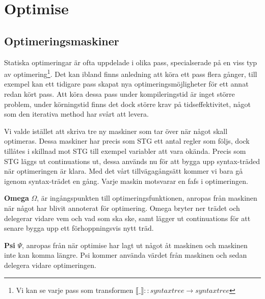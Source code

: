 \documentclass[Rapport]{subfiles}
\begin{document}
\section{Optimise}





\subsection{Optimeringsmaskiner}

Statiska optimeringar är ofta uppdelade i olika pass, specialserade på en viss
typ av optimering\footnote{Vi kan se varje pass som transformen $\llbracket \_ \rrbracket :: syntaxtree \rightarrow syntaxtree$}. Det kan ibland finns anledning att köra ett pass flera gånger, till exempel kan ett tidigare pass skapat nya optimeringsmöjligheter för ett annat redan kört pass. Att köra dessa pass under kompileringstid är inget större problem, under körningstid finns det dock större krav på tidseffektivitet, något som den iterativa 
method har svårt att levera.

Vi valde istället att skriva tre ny maskiner som tar över när något skall optimeras.
Dessa maskiner har precis som STG ett antal regler som följs, dock tillåtes i skillnad mot STG till exempel variabler att 
vara okända. Precis som STG läggs ut continuations ut, dessa används nu för att bygga upp syntax-träded när optimeringen är klara. Med det vårt tillvägagångsätt kommer vi bara gå igenom syntax-trädet en gång.
Varje maskin motsvarar en fafs i optimeringen.


\textbf{Omega} $\Omega$, är ingångspunkten till optimeringsfunktionen, anropas från maskinen
när något har blivit annoterat för optimering. Omega bryter ner trädet
och delegerar vidare vem och vad som ska ske, samt lägger ut continuations
för att senare bygga upp ett förhoppningsvis nytt träd.

\textbf{Psi} $\Psi$, anropas från när optimise har lagt ut något åt maskinen och
maskinen inte kan komma längre. Psi kommer använda värdet från maskinen
och sedan delegera vidare optimeringen.
\end{document}
